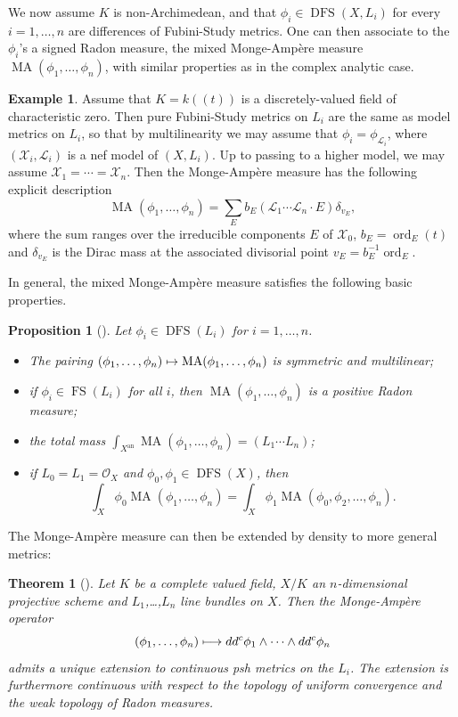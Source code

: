 \documentclass[JEP,XML,SOM,Unicode,published]{cedram}
\newcommand\mto{\mathchoice{\longmapsto}{\mapsto}{\mapsto}{\mapsto}}
\newcommand{\lpr}{(\!(}
\newcommand{\rpr}{)\!)}
\newtheorem{theo}[equation]{Theorem}
\newtheorem{prop}[equation]{Proposition}
\theoremstyle{definition}
\newtheorem{ex}[equation]{Example}
\newcommand \gO {\mathcal O}
\newcommand \Ld {\mathscr {L}}
\newcommand \X {\mathscr{X}}
\newcommand{\an}{\mathrm{an}}
\DeclareMathOperator{\DFS}{DFS}
\DeclareMathOperator{\FS}{FS}
\DeclareMathOperator{\MA}{MA}
\DeclareMathOperator{\ord}{ord}
\begin{document}
We now assume $K$ is non-Archimedean, and that $\phi_i \in \DFS(X, L_i)$ for every $i=1,\dots,n$ are differences of Fubini-Study metrics. One can then associate to the $\phi_i$'s a signed Radon measure, the mixed Monge-Ampère measure $\MA(\phi_1,\dots,\phi_n)$, with similar properties as in the complex analytic case.
\begin{ex} \label{ex MA model} Assume that $K=k\lpr t\rpr$ is a discretely-valued field of characteristic zero. Then pure Fubini-Study metrics on $L_i$ are the same as model metrics on $L_i$, so that by multilinearity we may assume that $\phi_i = \phi_{\Ld_i}$, where $(\X_i, \Ld_i)$ is a nef model of $(X, L_i)$. Up to passing to a higher model, we may assume $\X_1=\cdots=\X_n$. Then the Monge-Ampère measure has the following explicit description \cite{CL}
\[
\MA(\phi_1,\dots,\phi_n) = \sum_{E} b_E (\Ld_1 \cdots \Ld_n \cdot E) \delta_{v_E},
\]
where the sum ranges over the irreducible components $E$ of $\X_0$, $b_E = \ord_E(t)$ and $\delta_{v_E}$ is the Dirac mass at the associated divisorial point $v_E = b_E^{-1} \ord_E$.
\end{ex}
In general, the mixed Monge-Ampère measure satisfies the following basic properties.
\begin{prop}[{\cite[Prop.\,8.3]{BE}}]
Let $\phi_i \in \DFS(L_i)$ for $i=1,\dots,n$.
\begin{itemize}
\item The pairing $(\phi_1,\dots,\phi_n) \mto \MA(\phi_1,\dots,\phi_n)$ is symmetric and multilinear;
\item if $\phi_i \in \FS(L_i)$ for all $i$, then $\MA(\phi_1,\dots,\phi_n)$ is a positive Radon measure;
\item the total mass $\int_{X^{\an}} \MA(\phi_1,\dots,\phi_n) = (L_1 \cdots L_n)$;
\item if $L_0 = L_1 = \gO_X$ and $\phi_0, \phi_1 \in \DFS(X)$, then
\[
\int_X \phi_0 \MA(\phi_1,\dots,\phi_n) = \int_X \phi_1 \MA(\phi_0, \phi_2,\dots,\phi_n).
\]
\end{itemize}
\end{prop}
The Monge-Ampère measure can then be extended by density to more general metrics:
\begin{theo}[{\cite[Th.\,8.4]{BE}}]
Let $K$ be a complete valued field, $X/K$ an $n$\nobreakdash-di\-men\-sional projective scheme and $L_1$,\dots,$L_n$ line bundles on $X$. Then the Monge-Ampère operator
\[
(\phi_1,\dots, \phi_n) \mto dd^c \phi_1 \wedge\cdots  \wedge dd^c \phi_n
\]
admits a unique extension to continuous psh metrics on the $L_i$. The extension is furthermore continuous with respect to the topology of uniform convergence and the weak topology of Radon measures.
\end{theo}
\end{document}
